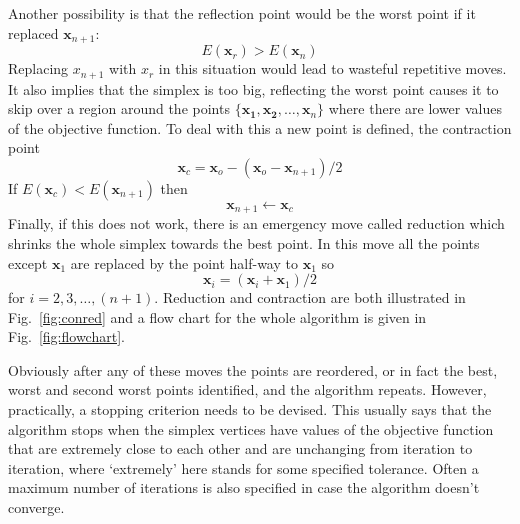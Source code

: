 \documentclass[11pt,a4paper]{scrartcl}
\begin{document}
Another possibility is that the reflection point would be the worst
point if it replaced $\mathbf{x}_{n+1}$:
\begin{equation}
E(\mathbf{x}_r)>E(\mathbf{x}_n)
\end{equation}
Replacing $x_{n+1}$ with $x_r$ in this situation would lead to
wasteful repetitive moves. It also implies that the simplex is too
big, reflecting the worst point causes it to skip over a region around
the points $\{\mathbf{x_1},\mathbf{x_2},\ldots,\mathbf{x}_n\}$ where
there are lower values of the objective function. To deal with this a
new point is defined, the contraction point
\begin{equation}
\mathbf{x}_c=\mathbf{x}_o-(\mathbf{x}_o-\mathbf{x}_{n+1})/2
\end{equation}
If $E(\mathbf{x}_c)<E(\mathbf{x}_{n+1})$ then
\begin{equation}
\mathbf{x}_{n+1}\leftarrow \mathbf{x}_c
\end{equation}
Finally, if this does not work, there is an emergency move called
reduction which shrinks the whole simplex towards the best point. In
this move all the points except $\mathbf{x}_1$ are replaced by the
point half-way to $\mathbf{x}_1$ so
\begin{equation}
\mathbf{x}_i=(\mathbf{x}_i+\mathbf{x}_1)/2
\end{equation}
for $i=2,3,\ldots,(n+1)$. Reduction and contraction are both
illustrated in Fig.~\ref{fig:conred} and a flow chart for the whole
algorithm is given in Fig.~\ref{fig:flowchart}.

Obviously after any of these moves the points are reordered, or in
fact the best, worst and second worst points identified, and the
algorithm repeats. However, practically, a stopping criterion needs to
be devised. This usually says that the algorithm stops when the
simplex vertices have values of the objective function that are
extremely close to each other and are unchanging from iteration to
iteration, where \lq{}extremely\rq{} here stands for some specified
tolerance. Often a maximum number of iterations is also specified in
case the algorithm doesn't converge.
\end{document}
